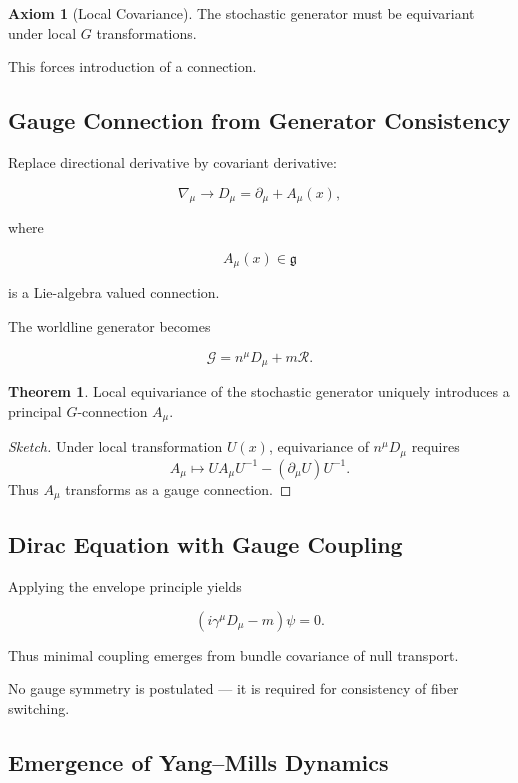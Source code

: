 \documentclass[11pt]{article}
\theoremstyle{definition}
\newtheorem{axiom}[definition]{Axiom}
\newtheorem{theorem}[definition]{Theorem}
\begin{document}
\begin{axiom}[Local Covariance]
The stochastic generator must be equivariant under local $G$ transformations.
\end{axiom}

This forces introduction of a connection.

\subsection{Gauge Connection from Generator Consistency}

Replace directional derivative by covariant derivative:

\[
\nabla_\mu
\longrightarrow
D_\mu
=
\partial_\mu + A_\mu(x),
\]

where

\[
A_\mu(x) \in \mathfrak{g}
\]

is a Lie-algebra valued connection.

The worldline generator becomes

\[
\mathcal{G}
=
n^\mu D_\mu
+
m\mathcal{R}.
\]

\begin{theorem}
Local equivariance of the stochastic generator uniquely introduces
a principal $G$-connection $A_\mu$.
\end{theorem}

\begin{proof}[Sketch]
Under local transformation $U(x)$,
equivariance of $n^\mu D_\mu$ requires
\[
A_\mu \mapsto U A_\mu U^{-1}
- (\partial_\mu U)U^{-1}.
\]
Thus $A_\mu$ transforms as a gauge connection.
\end{proof}

\subsection{Dirac Equation with Gauge Coupling}

Applying the envelope principle yields

\[
(i\gamma^\mu D_\mu - m)\psi = 0.
\]

Thus minimal coupling emerges from
bundle covariance of null transport.

No gauge symmetry is postulated —
it is required for consistency of fiber switching.

\subsection{Emergence of Yang–Mills Dynamics}
\end{document}

